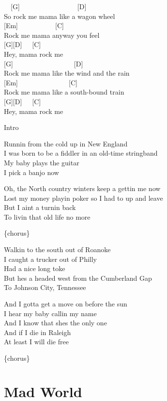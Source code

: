 \documentclass[
  letterpaper,
  a5paper]{memoir}
\begin{document}
~~{[}G{]}~~~~~~~~~~~~~~~~~{[}D{]}\\
So rock me mama like a wagon wheel\\
{[}Em{]}~~~~~~~~~~~{[}C{]}\\
Rock me mama anyway you feel\\
{[}G{]}{[}D{]}~~~{[}C{]}\\
Hey, mama rock me\\
{[}G{]}~~~~~~~~~~~~~~~~~~{[}D{]}\\
Rock me mama like the wind and the rain\\
{[}Em{]}~~~~~~~~~~~~~~~{[}C{]}\\
Rock me mama like a south-bound train\\
{[}G{]}{[}D{]}~~~{[}C{]}\\
Hey, mama rock me

Intro

Runnin\textquotesingle{} from the cold up in New England\\
I was born to be a fiddler in an old-time stringband\\
My baby plays the guitar\\
I pick a banjo now

Oh, the North country winters keep a gettin\textquotesingle{} me now\\
Lost my money playin\textquotesingle{} poker so I had to up and leave\\
But I ain\textquotesingle t a turnin\textquotesingle{} back\\
To livin\textquotesingle{} that old life no more

\{chorus\}

Walkin\textquotesingle{} to the south out of Roanoke\\
I caught a trucker out of Philly\\
Had a nice long toke\\
But he\textquotesingle s a headed west from the Cumberland Gap\\
To Johnson City, Tennessee

And I gotta get a move on before the sun\\
I hear my baby callin\textquotesingle{} my name\\
And I know that she\textquotesingle s the only one\\
And if I die in Raleigh\\
At least I will die free

\{chorus\}

\hypertarget{mad-world}{%
\chapter{Mad World}\label{mad-world}}
\end{document}
